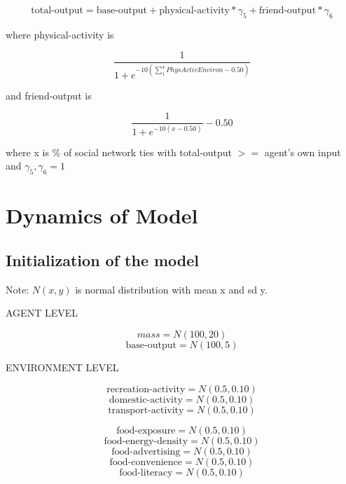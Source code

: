 \documentclass[12pt]{article}
\begin{document}
\begin{equation}
\text{total-output} = \text{base-output} + \text{physical-activity}*\gamma_5 + \text{friend-output}*\gamma_6
\end{equation}

where  physical-activity is

\begin{equation}
\frac{1}{1 + e^{-10(\sum_{1}^{4}PhysActivEnviron - 0.50)}}
\end{equation}

and friend-output is

\begin{equation}
\frac{1}{1 + e^{-10(x - 0.50)}} - 0.50
\end{equation}


where x is \% of social network ties with total-output $>=$ agent's own input and $\gamma_5, \gamma_6 = 1$


\section{Dynamics of Model}

\subsection{Initialization of the model}

Note: $N(x,y)$ is normal distribution with mean x and sd y.

AGENT LEVEL

$$ mass = N(100, 20)$$
$$ \text{base-output} = N(100, 5)$$

ENVIRONMENT LEVEL

$$ \text{recreation-activity} = N(0.5, 0.10) $$
$$ \text{domestic-activity} = N(0.5, 0.10) $$
$$ \text{transport-activity} = N(0.5, 0.10) $$

$$ \text{food-exposure} = N(0.5, 0.10) $$
$$ \text{food-energy-density} = N(0.5, 0.10) $$
$$ \text{food-advertising} = N(0.5, 0.10) $$
$$ \text{food-convenience} = N(0.5, 0.10) $$
$$ \text{food-literacy} = N(0.5, 0.10) $$
\end{document}
